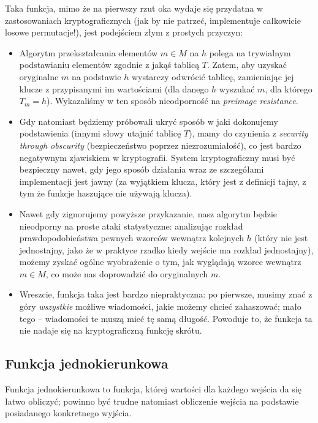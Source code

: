 \documentclass[12pt,a4paper,twoside]{article}
\begin{document}
Taka funkcja, mimo że na pierwszy rzut oka wydaje się przydatna w
zastosowaniach kryptograficznych (jak by nie patrzeć, implementuje całkowicie
losowe permutacje!), jest podejściem złym z prostych przyczyn:

\begin{itemize}
\item Algorytm przekształcania elementów $m \in M$ na $h$ polega na trywialnym
podstawianiu elementów zgodnie z jakąś tablicą $T$. Zatem, aby uzyskać
oryginalne $m$ na podstawie $h$ wystarczy odwrócić tablicę, zamieniając jej
klucze z przypisanymi im wartościami (dla danego $h$ wyszukać $m$, dla którego
$T_m = h$). Wykazaliśmy w ten sposób nieodporność na \textit{preimage
resistance}.
\item Gdy natomiast będziemy próbowali ukryć sposób w jaki dokonujemy
podstawienia (innymi słowy utajnić tablicę $T$), mamy do czynienia z
\textit{security through obscurity} (bezpieczeństwo poprzez niezrozumiałość),
co jest bardzo negatywnym zjawiskiem w kryptografii. System kryptograficzny
musi być bezpieczny nawet, gdy jego sposób działania wraz ze szczegółami
implementacji jest jawny (za wyjątkiem klucza, który jest z definicji tajny, z
tym że funkcje haszujące nie używają klucza).
\item Nawet gdy zignorujemy powyższe przykazanie, nasz algorytm będzie
nieodporny na proste ataki statystyczne: analizując rozkład prawdopodobieństwa
pewnych wzorców wewnątrz kolejnych $h$ (który nie jest jednostajny, jako że w
praktyce rzadko kiedy wejście ma rozkład jednostajny), możemy zyskać ogólne
wyobrażenie o tym, jak wyglądają wzorce wewnątrz $m \in M$, co może nas
doprowadzić do oryginalnych $m$.
\item Wreszcie, funkcja taka jest bardzo niepraktyczna: po pierwsze, musimy
znać z góry \emph{wszystkie} możliwe wiadomości, jakie możemy chcieć
zahaszować; mało tego -- wiadomości te muszą mieć tę samą długość. Powoduje to,
że funkcja ta nie nadaje się na kryptograficzną funkcję skrótu.
\end{itemize}



\subsection{Funkcja jednokierunkowa}
Funkcja jednokierunkowa to funkcja, której wartości dla każdego wejścia da się
łatwo obliczyć; powinno być trudne natomiast obliczenie wejścia na podstawie
posiadanego konkretnego wyjścia.
\end{document}
